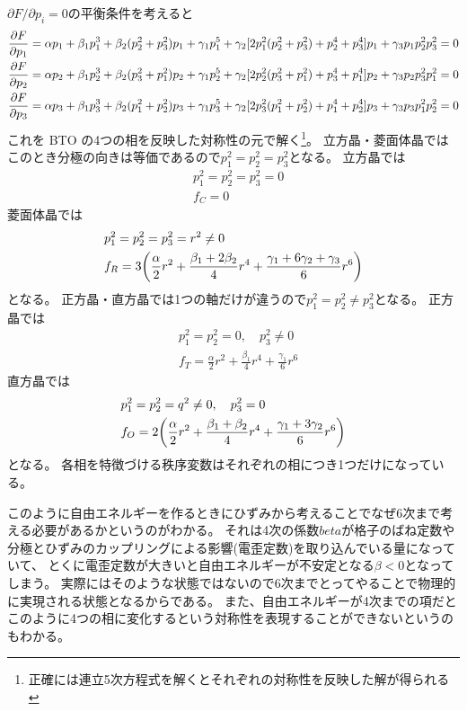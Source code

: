 \documentclass[9pt,dvipdfmx,a4paper]{jsarticle}
\begin{document}
\(\partial F/ \partial p_i = 0\)の平衡条件を考えると
\begin{align}
    \pdv{F}{p_1} &= \alpha p_1 +\beta_1p_1^3+ \beta_2(p_2^2+p_3^2)p_1
    +\gamma_1p_1^5+\gamma_2[2p_1^2(p_2^2+p_3^2)+p_2^4+p_3^4]p_1+\gamma_3p_1p_2^2p_3^2 = 0\\
    \pdv{F}{p_2} &= \alpha p_2 +\beta_1p_2^3+ \beta_2(p_3^2+p_1^2)p_2
    +\gamma_1p_2^5+\gamma_2[2p_2^2(p_3^2+p_1^2)+p_3^4+p_1^4]p_2+\gamma_3p_2p_3^2p_1^2 = 0\\
    \pdv{F}{p_3} &= \alpha p_3 +\beta_1p_3^3+ \beta_2(p_1^2+p_2^2)p_3
    +\gamma_1p_3^5+\gamma_2[2p_3^2(p_1^2+p_2^2)+p_1^4+p_2^4]p_3+\gamma_3p_3p_1^2p_2^2 = 0
\end{align}
これを BTO の4つの相を反映した対称性の元で解く\footnote{正確には連立5次方程式を解くとそれぞれの対称性を反映した解が得られる}。
立方晶・菱面体晶では
このとき分極の向きは等価であるので\(p_1^2 = p_2^2 = p_3^2\)となる。
立方晶では
\begin{align}
    &p_1^2 = p_2^2 = p_3^2 =0\\
    &f_C = 0
\end{align}
菱面体晶では
\begin{align}
    &p_1^2 = p_2^2 = p_3^2 = r^2 \neq 0\\
    &f_R = 3\qty(\frac{\alpha}{2}r^2+\frac{\beta_1+2\beta_2}{4}r^4+\frac{\gamma_1+6\gamma_2+\gamma_3}{6}r^6)
\end{align}
となる。
正方晶・直方晶では1つの軸だけが違うので\(p_1^2 = p_2^2 \neq p_3^2\)となる。
正方晶では
\begin{align}
    &p_1^2 = p_2^2 = 0, \quad p_3^2 \neq 0\\
    &f_T = \frac{\alpha}{2}r^2+\frac{\beta_1}{4}r^4+\frac{\gamma_1}{6}r^6
\end{align}
直方晶では
\begin{align}
    &p_1^2 = p_2^2 = q^2 \neq 0, \quad p_3^2 = 0\\
    &f_O = 2\qty(\frac{\alpha}{2}r^2+\frac{\beta_1+\beta_2}{4}r^4+\frac{\gamma_1+3\gamma_2}{6}r^6)
\end{align}
となる。
各相を特徴づける秩序変数はそれぞれの相につき1つだけになっている。

このように自由エネルギーを作るときにひずみから考えることでなぜ6次まで考える必要があるかというのがわかる。
それは4次の係数\(beta\)が格子のばね定数や分極とひずみのカップリングによる影響(電歪定数)を取り込んでいる量になっていて、
とくに電歪定数が大きいと自由エネルギーが不安定となる\(\beta<0\)となってしまう。
実際にはそのような状態ではないので6次までとってやることで物理的に実現される状態となるからである。
また、自由エネルギーが4次までの項だとこのように4つの相に変化するという対称性を表現することができないというのもわかる。
\end{document}

